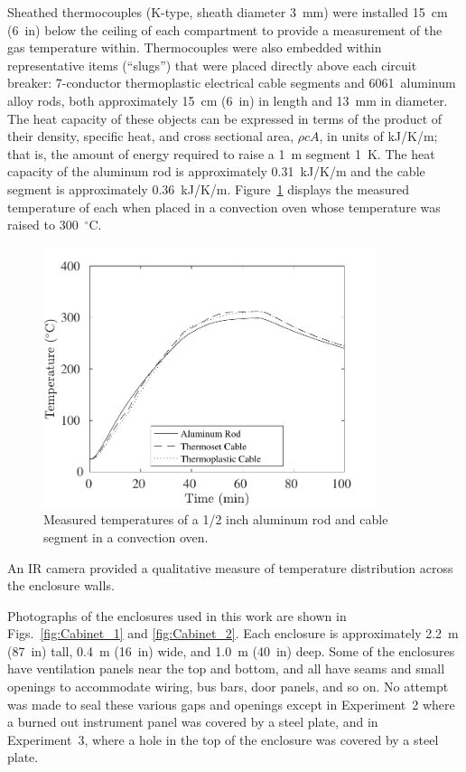 \documentclass[12pt]{article}
\begin{document}
Sheathed thermocouples (K-type, sheath diameter 3~mm) were installed 15~cm (6~in) below the ceiling of each compartment to provide a measurement of the gas temperature within. Thermocouples were also embedded within representative items (``slugs'') that were placed directly above each circuit breaker: 7-conductor thermoplastic electrical cable segments and 6061~aluminum alloy rods, both approximately  15~cm (6~in) in length and 13~mm in diameter. The heat capacity of these objects can be expressed in terms of the product of their density, specific heat, and cross sectional area, $\rho c A$, in units of kJ/K/m; that is, the amount of energy required to raise a 1~m segment 1~K. The heat capacity of the aluminum rod is approximately 0.31~kJ/K/m and the cable segment is approximately 0.36~kJ/K/m. Figure~\ref{oven} displays the measured temperature of each when placed in a convection oven whose temperature was raised to 300~$^\circ$C.

\begin{figure}[!ht]
\centering
\includegraphics[height=3.0in]{../SCRIPT_FIGURES/Oven_Test}
\caption[Measured temperatures of slug calorimeters in a convection oven]{Measured temperatures of a 1/2 inch aluminum rod and cable segment in a convection oven.}
\label{oven}
\end{figure}

An IR camera provided a qualitative measure of temperature distribution across the enclosure walls.

Photographs of the enclosures used in this work are shown in Figs.~\ref{fig:Cabinet_1} and \ref{fig:Cabinet_2}. Each enclosure is approximately 2.2~m (87~in) tall, 0.4~m (16~in) wide, and 1.0~m (40~in) deep. Some of the enclosures have ventilation panels near the top and bottom, and all have seams and small openings to accommodate wiring, bus bars, door panels, and so on. No attempt was made to seal these various gaps and openings except in Experiment~2 where a burned out instrument panel was covered by a steel plate, and in Experiment~3, where a hole in the top of the enclosure was covered by a steel plate.
\end{document}
